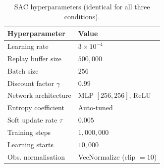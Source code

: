 \begin{table}[t]
\centering
\caption{SAC hyperparameters (identical for all three conditions).}
\label{tab:hyperparams}
\begin{tabular}{ll}
\hline
\textbf{Hyperparameter} & \textbf{Value} \\
\hline
Learning rate            & $3 \times 10^{-4}$ \\
Replay buffer size       & $500{,}000$ \\
Batch size               & $256$ \\
Discount factor $\gamma$ & $0.99$ \\
Network architecture     & MLP $[256, 256]$, ReLU \\
Entropy coefficient      & Auto-tuned~\cite{haarnoja2018soft} \\
Soft update rate $\tau$  & $0.005$ \\
Training steps           & $1{,}000{,}000$ \\
Learning starts          & $10{,}000$ \\
Obs. normalisation       & VecNormalize (clip $= 10$) \\
\hline
\end{tabular}
\end{table}